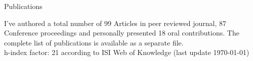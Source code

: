 \begin{cvblock}{Publications}
\end{cvblock}
I've authored a total number of 99 Articles in peer reviewed journal,
87 Conference proceedings and personally presented 18 oral
contributions. The complete list of publications is available as a
separate file. \\
h-index factor: 21 according to ISI Web of Knowledge (last update \today)

